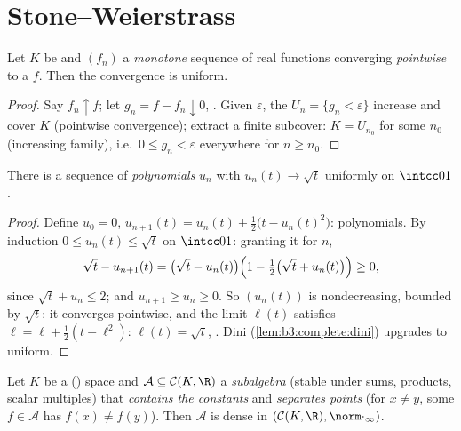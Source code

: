 \section{Stone--Weierstrass}

\begin{lemma}[Dini]\label{lem:b3:complete:dini}
Let $K$ be  and $(f_n)$ a \emph{monotone} sequence of
 real functions converging \emph{pointwise} to a
 $f$. Then the convergence is
uniform.
\end{lemma}

\begin{proof}
Say $f_n \uparrow f$; let $g_n = f - f_n \downarrow 0$,
. Given $\varepsilon$, the  $U_n = \{g_n <
\varepsilon\}$ increase and cover $K$ (pointwise convergence);
extract a finite subcover: $K = U_{n_0}$ for some $n_0$
(increasing family), i.e.\ $0 \leq g_n < \varepsilon$
everywhere for $n \geq n_0$.
\end{proof}

\begin{lemma}\label{lem:b3:complete:sqrt}
There is a sequence of \emph{polynomials} $u_n$ with $u_n(t) \to
\sqrt t$ uniformly on $\intcc01$.
\end{lemma}

\begin{proof}
Define $u_0 = 0$, $u_{n+1}(t) = u_n(t) + \frac12\bigl(t -
u_n(t)^2\bigr)$: polynomials. By induction $0 \leq u_n(t) \leq
\sqrt t$ on $\intcc01$: granting it for $n$,
\[
\sqrt t - u_{n+1}(t) = \bigl(\sqrt t - u_n(t)\bigr)
\Bigl(1 - \tfrac12\bigl(\sqrt t + u_n(t)\bigr)\Bigr) \geq 0,
\]
since $\sqrt t + u_n \leq 2$; and $u_{n+1} \geq u_n \geq 0$.
So $(u_n(t))$ is nondecreasing, bounded by $\sqrt t$: it
converges pointwise, and the limit $\ell(t)$ satisfies $\ell =
\ell + \frac12(t - \ell^2)$: $\ell(t) = \sqrt t$, .
Dini (\cref{lem:b3:complete:dini}) upgrades to uniform.
\end{proof}

\begin{theorem}
\label{thm:b3:complete:stoneweierstrass}
Let $K$ be a  () space and $\mathcal A \subseteq
\mathcal C(K, \R)$ a \emph{subalgebra} (stable under sums,
products, scalar multiples) that \emph{contains the constants}
and \emph{separates points} (for $x \neq y$, some $f \in
\mathcal A$ has $f(x) \neq f(y)$). Then $\mathcal A$ is dense in
$(\mathcal C(K,\R), \norm\cdot_\infty)$.
\end{theorem}

